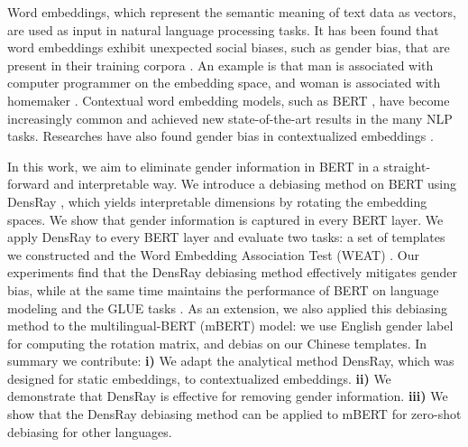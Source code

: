Word embeddings, which represent the semantic meaning of text data as vectors, are used as input in natural language processing tasks. It has been found that word embeddings exhibit unexpected social biases, such as gender bias, that are present in their training corpora \citep{bolukbasi2016man, caliskan2017semantics,garg2018word}. An example is that man is associated with computer programmer on the embedding space, and woman is associated with homemaker \citep{bolukbasi2016man}. Contextual word embedding models, such as BERT \citep{devlin2018bert}, have become increasingly common and achieved new state-of-the-art results in the many NLP tasks. Researches have also found gender bias in contextualized embeddings \citep{zhao2019gender,may2019measuring}.

In this work, we aim to eliminate gender information in BERT in a straight-forward and interpretable way. We introduce a debiasing method on BERT using DensRay \citep{dufter2019analytical}, which yields interpretable dimensions by rotating the embedding spaces. We show that gender information is captured in every BERT layer. We apply DensRay to every BERT layer and evaluate two tasks: a set of templates we constructed and the Word Embedding Association Test (WEAT) \citep{caliskan2017semantics}. Our experiments find that the DensRay debiasing method effectively mitigates gender bias, while at the same time maintains the performance of BERT on language modeling and the GLUE tasks \citep{wang2018glue}. As an extension, we also applied this debiasing method to the multilingual-BERT (mBERT) model: we use English gender label for computing the rotation matrix, and debias on our Chinese templates. In summary we contribute: \textbf{i)} We adapt the analytical method DensRay, which was designed for static embeddings, to contextualized embeddings. \textbf{ii)} We demonstrate that DensRay is effective for removing gender information. \textbf{iii)}  We show that the DensRay debiasing method can be applied to mBERT for zero-shot debiasing for other languages.